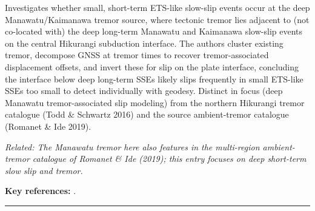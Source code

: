 \documentclass[10pt,a4paper]{article}
\newcommand{\catentryrule}{\par\vspace{3pt}\noindent\textcolor{rulegrey}{\rule{\linewidth}{0.3pt}}\par\vspace{5pt}}
\begin{document}
\par\vspace{2pt}Investigates whether small, short-term ETS-like slow-slip events occur at the deep Manawatu/Kaimanawa tremor source, where tectonic tremor lies adjacent to (not co-located with) the deep long-term Manawatu and Kaimanawa slow-slip events on the central Hikurangi subduction interface. The authors cluster existing tremor, decompose GNSS at tremor times to recover tremor-associated displacement offsets, and invert these for slip on the plate interface, concluding the interface below deep long-term SSEs likely slips frequently in small ETS-like SSEs too small to detect individually with geodesy. Distinct in focus (deep Manawatu tremor-associated slip modeling) from the northern Hikurangi tremor catalogue (Todd \& Schwartz 2016) and the source ambient-tremor catalogue (Romanet \& Ide 2019).
\par{\small\itshape Related: The Manawatu tremor here also features in the multi-region ambient-tremor catalogue of Romanet \& Ide (2019); this entry focuses on deep short-term slow slip and tremor.}
\par\vspace{2pt}\textbf{Key references:} \cite{Fasola2023,Romanet2019}.
\catentryrule
\end{document}
